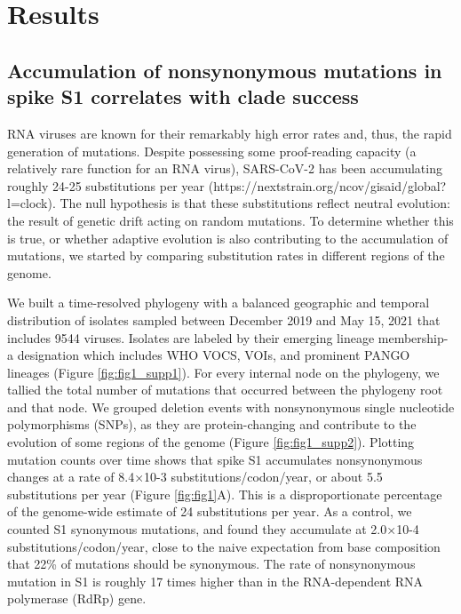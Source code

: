 \documentclass[12pt, letterpaper]{article}
\begin{document}
\section*{Results}
\subsection*{Accumulation of nonsynonymous mutations in spike S1 correlates with clade success}
RNA viruses are known for their remarkably high error rates and, thus, the rapid generation of mutations. Despite possessing some proof-reading capacity (a relatively rare function for an RNA virus), SARS-CoV-2 has been accumulating roughly 24-25 substitutions per year (https://nextstrain.org/ncov/gisaid/global?l=clock). The null hypothesis is that these substitutions reflect neutral evolution: the result of genetic drift acting on random mutations. To determine whether this is true, or whether adaptive evolution is also contributing to the accumulation of mutations, we started by comparing substitution rates in different regions of the genome.

We built a time-resolved phylogeny with a balanced geographic and temporal distribution of isolates sampled between December 2019 and May 15, 2021 that includes 9544 viruses. Isolates are labeled by their emerging lineage membership- a designation which includes WHO VOCS, VOIs, and prominent PANGO lineages (Figure \ref{fig:fig1_supp1}). For every internal node on the phylogeny, we tallied the total number of mutations that occurred between the phylogeny root and that node. We grouped deletion events with nonsynonymous single nucleotide polymorphisms (SNPs), as they are protein-changing and contribute to the evolution of some regions of the genome (Figure \ref{fig:fig1_supp2}). Plotting mutation counts over time shows that spike S1 accumulates nonsynonymous changes at a rate of 8.4×10-3 substitutions/codon/year, or about 5.5 substitutions per year (Figure \ref{fig:fig1}A). This is a disproportionate percentage of the genome-wide estimate of 24 substitutions per year. As a control, we counted S1 synonymous mutations, and found they accumulate at 2.0×10-4 substitutions/codon/year, close to the naive expectation from base composition that 22\% of mutations should be synonymous. The rate of nonsynonymous mutation in S1 is roughly 17 times higher than in the RNA-dependent RNA polymerase (RdRp) gene.
\end{document}
